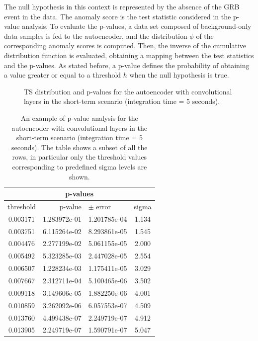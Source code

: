The null hypothesis in this context is represented by the absence of the GRB event in the data. The anomaly score is the test statistic considered in the p-value analysis. To evaluate the p-values, a data set composed of background-only data samples is fed to the autoencoder, and the distribution $\phi$ of the corresponding anomaly scores is computed. Then, the inverse of the cumulative distribution function is evaluated, obtaining a mapping between the test statistics and the p-values. As stated before, a p-value defines the probability of obtaining a value greater or equal to a threshold $h$ when the null hypothesis is true. 
\begin{figure}[t]
    \centering
    \begin{minipage}{0.5\textwidth}
        \centering
        
    \end{minipage}%
    \begin{minipage}{0.5\textwidth}
       \centering
       
    \end{minipage}
    \caption{TS distribution and p-values for the autoencoder with convolutional layers in the short-term scenario (integration time = 5 seconds).}
    \label{fig:ts-distribution-and-p-values-cnn-it-5}
\end{figure}
\begin{table}[]
\centering
\begin{tabular}{|crlc|}
\hline
\multicolumn{4}{|c|}{\textbf{p-values}} \\
\hline
threshold & p-value & $\pm$ error &  sigma \\
\midrule
0.003171 &  1.283972e-01 &  1.201785e-04 &  1.134 \\
0.003751 &  6.115264e-02 &  8.293861e-05 &  1.545 \\
0.004476 &  2.277199e-02 &  5.061155e-05 &  2.000 \\
0.005492 &  5.323285e-03 &  2.447028e-05 &  2.554 \\
0.006507 &  1.228234e-03 &  1.175411e-05 &  3.029 \\
0.007667 &  2.312711e-04 &  5.100465e-06 &  3.502 \\
0.009118 &  3.149606e-05 &  1.882250e-06 &  4.001 \\
0.010859 &  3.262092e-06 &  6.057553e-07 &  4.509 \\
0.013760 &  4.499438e-07 &  2.249719e-07 &  4.912 \\
0.013905 &  2.249719e-07 &  1.590791e-07 &  5.047 \\
\bottomrule
\end{tabular}
\caption{An example of p-value analysis for the autoencoder with convolutional layers in the short-term scenario (integration time = 5 seconds). The table shows a subset of all the rows, in particular only the threshold values corresponding to predefined sigma levels are shown.}
\label{tab:p-value-table-cnn-itime-5}
\end{table}
